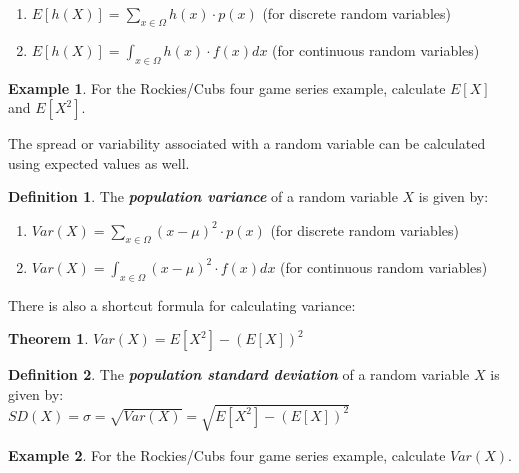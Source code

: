 \documentclass[
  11pt,
]{book}
\newtheorem{theorem}{Theorem}[chapter]
\theoremstyle{definition}
\newtheorem{definition}{Definition}[chapter]
\theoremstyle{definition}
\newtheorem{example}{Example}[chapter]
\theoremstyle{definition}
\theoremstyle{definition}
\theoremstyle{remark}
\begin{document}
\begin{enumerate}
\def\labelenumi{(\roman{enumi})}
\item
  \(E[h(X)] = \sum_{x \in \Omega} h(x) \cdot p(x)\) (for discrete random variables)
\item
  \(E[h(X)] = \int_{x \in \Omega} h(x) \cdot f(x) dx\) (for continuous random variables)
\end{enumerate}

\begin{example}
For the Rockies/Cubs four game series example, calculate \(E[X]\) and \(E[X^2]\).
\end{example}

\hfill\break
\hfill\break
\hfill\break
\hfill\break
\hfill\break

The spread or variability associated with a random variable can be calculated using expected values as well.

\begin{definition}

The \textbf{\emph{population variance}} of a random variable \(X\) is given by:\\

\begin{enumerate}
\def\labelenumi{(\roman{enumi})}
\item
  \(Var(X) = \sum_{x \in \Omega} (x-\mu)^2 \cdot p(x)\) (for discrete random variables)
\item
  \(Var(X) = \int_{x \in \Omega} (x-\mu)^2 \cdot f(x) dx\) (for continuous random variables)
\end{enumerate}

\end{definition}

There is also a shortcut formula for calculating variance:\\

\begin{theorem}
\(Var(X) = E[X^2] - (E[X])^2\)
\end{theorem}

\begin{definition}
The \textbf{\emph{population standard deviation}} of a random variable \(X\) is given by:\\

\(SD(X) = \sigma = \sqrt{Var(X)} = \sqrt{E[X^2]-(E[X])^2}\)
\end{definition}

\begin{example}
For the Rockies/Cubs four game series example, calculate \(Var(X)\).
\end{example}
\end{document}
